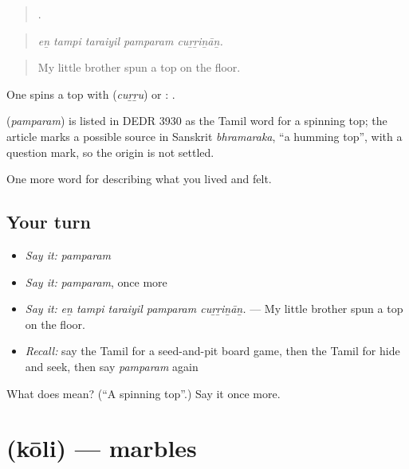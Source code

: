 \begin{quote}
    .
\end{quote}

\begin{quote}
\emph{eṉ tampi taraiyil pamparam cuṟṟiṉāṉ.}
\end{quote}

\begin{quote}
My little brother spun a top on the floor.
\end{quote}

One spins a top with  (\emph{cuṟṟu}) or :  .

\begin{cousinweb}
\textbf{} (\emph{pamparam}) is listed in DEDR 3930 as the Tamil word for a spinning top; the article marks a possible source in Sanskrit \emph{bhramaraka}, \textquotedblleft{}a humming top\textquotedblright{}, with a question mark, so the origin is not settled.
\end{cousinweb}

\begin{grammarlens}[title={What you've built}]
One more word for describing what you lived and felt.
\end{grammarlens}

\subsection*{Your turn}
\begin{itemize}
\raggedright
  \item \emph{Say it:} \emph{pamparam}
  \item \emph{Say it:} \emph{pamparam}, once more
  \item \emph{Say it:} \emph{eṉ tampi taraiyil pamparam cuṟṟiṉāṉ.} — My little brother spun a top on the floor.
  \item \emph{Recall:} say the Tamil for a seed-and-pit board game, then the Tamil for hide and seek, then say \emph{pamparam} again
\end{itemize}

\begin{tcolorbox}[breakable,colback=teal!4,colframe=teal!35!black,title={Before you move on}]
What does  mean? (\textquotedblleft{}A spinning top\textquotedblright{}.) Say it once more.
\end{tcolorbox}
\section[\texorpdfstring{\ta{கோலி} (kōli)}{கோலி (kōli)}]{ (kōli) — marbles}

